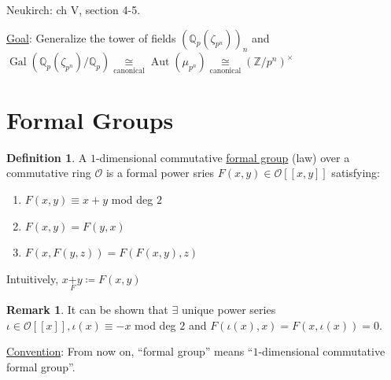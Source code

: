 \documentclass[openany]{amsbook}
\numberwithin{section}{chapter}
\theoremstyle{definition}
\newtheorem*{definition}{Definition}
\newtheorem*{remark}{Remark}
\begin{document}
Neukirch: ch V, section 4-5.

\underline{Goal}: Generalize the tower of fields \((\mathbb{Q}_p(\zeta_{p^n}))_n\) and \(\operatorname{Gal}(\mathbb{Q}_{p}(\zeta_{p^n}) / \mathbb{Q}_p) \underset{\text{canonical}}{\cong} \operatorname{Aut}(\mu_{p^n})\underset{\text{canonical}}{\cong}(\mathbb{Z} / p^n)^\times  \) 

\section*{Formal Groups}

\begin{definition}
    A \(1\)-dimensional commutative \underline{formal group} (law) over a commutative ring \(\mathcal{O}\) is a formal power sries \(F(x,y) \in \mathcal{O} [[x,y]]\) satisfying:

    \begin{enumerate}[label=\arabic*)]
        \item \(F(x,y) \equiv x+y\) mod deg \(2\)
        \item \(F(x,y) = F(y,x)\)
        \item \(F(x,F(y,z))=F(F(x,y),z)\) 
    \end{enumerate} 
\end{definition}

Intuitively, \(x \underset{F}{+} y \coloneqq F(x,y)\) 

\begin{remark}
    It can be shown that \(\exists\) unique power series \(\iota \in \mathcal{O} [[x]], \iota(x) \equiv -x \) mod deg \(2\) and \(F(\iota(x),x) = F(x,\iota(x))=0\).
\end{remark}

\underline{Convention}: From now on, ``formal group'' means ``\(1\)-dimensional commutative formal group''.
\end{document}
